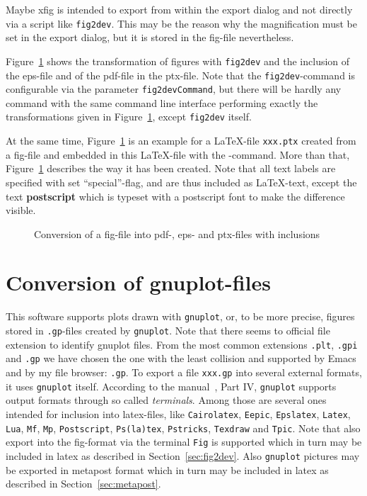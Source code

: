 \documentclass[12pt]{book}
\begin{document}
Maybe xfig is intended to export from within the export dialog 
and not directly via a script like \texttt{fig2dev}. 
This may be the reason 
why the magnification must be set in the export dialog, 
but it is stored in the fig-file nevertheless. 

Figure~\ref{fig:fig2dev} shows the transformation 
of figures with \texttt{fig2dev} 
and the inclusion of the eps-file and of the pdf-file in the ptx-file. 
Note that the \texttt{fig2dev}-command is configurable 
via the parameter \texttt{fig2devCommand}, 
but there will be hardly any command with the same command line interface 
performing exactly the transformations given in Figure~\ref{fig:fig2dev}, 
except \texttt{fig2dev} itself. 

At the same time, Figure~\ref{fig:fig2dev} is an example 
for a \LaTeX-file \texttt{xxx.ptx} created from a fig-file 
and embedded in this \LaTeX-file 
with the -command. 
More than that, 
Figure~\ref{fig:fig2dev} describes the way it has been created. 
Note that all text labels are specified with set ``special''-flag, 
and are thus included as \LaTeX-text, 
except the text \textbf{\tiny postscript} 
which is typeset with a postscript font to make the difference visible. 


\begin{figure}[htb]
\centering
{}
\caption{\label{fig:fig2dev}Conversion of a fig-file 
into pdf-, eps- and ptx-files with inclusions}
\end{figure}


\section{Conversion of gnuplot-files}\label{sec:gnuplot2dev}

This software supports plots drawn with \texttt{gnuplot}, 
or, to be more precise, 
figures stored in \texttt{.gp}-files created by \texttt{gnuplot}. 
Note that there seems to official file extension 
to identify gnuplot files. 
From the most common extensions \texttt{.plt}, \texttt{.gpi} and \texttt{.gp} 
we have chosen the one with the least collision 
and supported by Emacs and by my file browser: \texttt{.gp}. 
To export a file \texttt{xxx.gp} into several external formats, 
it uses \texttt{gnuplot} itself. 
According to the manual~\cite{GnuPlot}, Part IV, 
\texttt{gnuplot} supports output formats through so called {\em terminals}. 
Among those are several ones intended for inclusion into latex-files, 
like \texttt{Cairolatex}, \texttt{Eepic}, \texttt{Epslatex}, 
\texttt{Latex}, \texttt{Lua}, 
\texttt{Mf}, \texttt{Mp}, \texttt{Postscript}, \texttt{Ps(la)tex}, %
\texttt{Pstricks}, \texttt{Texdraw} and \texttt{Tpic}. 
Note that also export into the fig-format via the terminal \texttt{Fig} 
is supported which in turn may be included in latex 
as described in Section~\ref{sec:fig2dev}. 
Also \texttt{gnuplot} pictures may be exported in metapost format 
which in turn may be included in latex 
as described in Section~\ref{sec:metapost}. 
\end{document}
